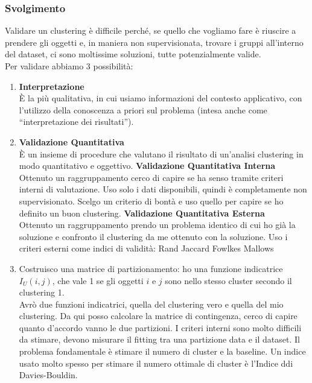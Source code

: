\documentclass{article}
\begin{document}
\subsubsection*{Svolgimento}
Validare un clustering è difficile perché, se quello che vogliamo fare è riuscire a prendere gli oggetti e, in maniera non supervisionata, trovare i gruppi all'interno del dataset, ci sono moltissime soluzioni, tutte potenzialmente valide.\\
Per validare abbiamo 3 possibilità:
\begin{enumerate}
    \item \textbf{Interpretazione}\\ È la più qualitativa, in cui usiamo informazioni del contesto applicativo, con l'utilizzo della conoscenza a priori sul problema (intesa anche come “interpretazione dei risultati”).
    \item \textbf{Validazione Quantitativa}\\È un insieme di procedure che valutano il risultato di un'analisi clustering in modo quantitativo e oggettivo.
     \textbf{Validazione Quantitativa Interna}\\ Ottenuto un raggruppamento cerco di capire se ha senso tramite criteri interni di valutazione. Uso solo i dati disponibili, quindi è completamente non supervisionato. Scelgo un criterio di bontà e uso quello per capire se ho definito un buon clustering. 
     \textbf{Validazione Quantitativa Esterna}\\ Ottenuto un raggruppamento prendo un problema identico di cui ho già la soluzione e confronto il clustering da me ottenuto con la soluzione. Uso i criteri esterni come indici di validità:
        \subsubitem{-} Rand
        \subsubitem{-} Jaccard
        \subsubitem{-} Fowlkes
        \subsubitem{-} Mallows
    \item[] Costruisco una matrice di partizionamento: ho una funzione indicatrice $I_U(i,j)$, che vale 1 se gli oggetti $i$ e $j$ sono nello stesso cluster secondo il clustering 1.\\
    Avrò due funzioni indicatrici, quella del clustering vero e quella del mio clustering. Da qui posso calcolare la matrice di contingenza, cerco di capire quanto d'accordo vanno le due partizioni. 
     I criteri interni sono molto difficili da stimare, devono misurare il fitting tra una partizione data e il dataset. Il problema fondamentale è stimare il numero di cluster e la baseline. Un indice usato molto spesso per stimare il numero ottimale di cluster è l'Indice ddi Davies-Bouldin.
\end{enumerate}
\end{document}
